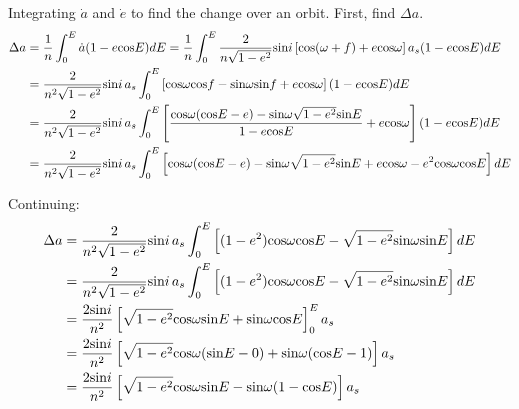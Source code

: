 \documentclass[]{aiaa-tc}%
\begin{document}
\subsection{}

Integrating $\dot{a}$ and $\dot{e}$ to find the change over an orbit. First, find $\Delta a$.
	\begin{equation}
\begin{aligned} 
\Delta a&=\frac{1}{n}\int_{0}^E \dot{a}(1-e\textup{cos}E)dE=\frac{1}{n}\int_{0}^{E}\frac{2}{n\sqrt{1-e^2}}\textup{sin}i \left [ \textup{cos}(\omega +f )+e\textup{cos}\omega \right ]a_s(1-e\textup{cos}E)dE\\
 &= \frac{2}{n^2\sqrt{1-e^2}}\textup{sin}i\,a_s\int_{0}^{E}\left [ \textup{cos}\omega\textup{cos}f- \textup{sin}\omega\textup{sin}f +e\textup{cos}\omega \right ](1-e\textup{cos}E)dE \\
 &= \frac{2}{n^2\sqrt{1-e^2}}\textup{sin}i\,a_s\int_{0}^{E}\left [ \frac{\textup{cos}\omega(\textup{cos}E-e)- \textup{sin}\omega\sqrt{1-e^2}\textup{sin}E}{1-e\textup{cos}E}  +e\textup{cos}\omega\right ](1-e\textup{cos}E)dE \\ 
 &= \frac{2}{n^2\sqrt{1-e^2}}\textup{sin}i\,a_s\int_{0}^{E}\left [ \textup{cos}\omega(\textup{cos}E-e)- \textup{sin}\omega\sqrt{1-e^2}\textup{sin}E  +e\textup{cos}\omega-e^2\textup{cos}\omega\textup{cos}E\right ]dE \\ 
\end{aligned}
	\end{equation}

Continuing:
	\begin{equation}
\begin{aligned} 
\Delta a&=\frac{2}{n^2\sqrt{1-e^2}}\textup{sin}i\,a_s\int_{0}^{E}\left [ (1-e^2)\textup{cos}\omega\textup{cos}E- \sqrt{1-e^2}\textup{sin}\omega\textup{sin}E\right ]dE \\ 
 &=\frac{2}{n^2\sqrt{1-e^2}}\textup{sin}i\,a_s\int_{0}^{E}\left [ (1-e^2)\textup{cos}\omega\textup{cos}E- \sqrt{1-e^2}\textup{sin}\omega\textup{sin}E\right ]dE \\ 
 &=\frac{2\textup{sin}i}{n^2}\left [ \sqrt{1-e^2}\textup{cos}\omega\textup{sin}E+ \textup{sin}\omega\textup{cos}E\right ]_0^Ea_s \\ 
 &=\frac{2\textup{sin}i}{n^2}\left [ \sqrt{1-e^2}\textup{cos}\omega(\textup{sin}E-0)+ \textup{sin}\omega(\textup{cos}E-1)\right ]a_s \\ 
 &=\frac{2\textup{sin}i}{n^2}\left [ \sqrt{1-e^2}\textup{cos}\omega\textup{sin}E -\textup{sin}\omega(1-\textup{cos}E)\right ]a_s \\ 
\end{aligned}
\label{eqn:delta_a}
	\end{equation}
\end{document}
